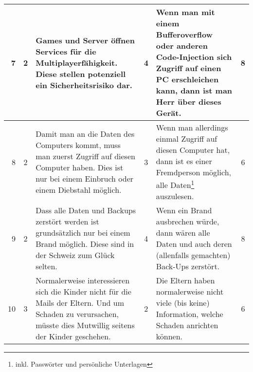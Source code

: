 \begin{landscape}
\begin{tabularx}{\columnwidth}{|r|c|X|c|X|c|}
	7 &  \cellcolor{yellow}2 & Games und Server öffnen Services für die Multiplayerfähigkeit. Diese stellen potenziell ein Sicherheitsrisiko dar. & \cellcolor{red}4 & Wenn man mit einem Bufferoverflow oder anderen Code-Injection sich Zugriff auf einen PC erschleichen kann, dann ist man Herr über dieses Gerät. & \cellcolor{orange}8 \\ \hline
	8 &  \cellcolor{yellow}2 & Damit man an die Daten des Computers kommt, muss man zuerst Zugriff auf diesen Computer haben. Dies ist nur bei einem Einbruch oder einem Diebstahl möglich. & \cellcolor{orange}3 & Wenn man allerdings einmal Zugriff auf diesen Computer hat, dann ist es einer Fremdperson möglich, alle Daten\footnote{inkl. Passwörter und persönliche Unterlagen} auszulesen.  & \cellcolor{yellow}6 \\ \hline
	9 &  \cellcolor{yellow}2 & Dass alle Daten und Backups zerstört werden ist grundsätzlich nur bei einem Brand möglich. Diese sind in der Schweiz zum Glück selten. & \cellcolor{red}4 & Wenn ein Brand ausbrechen würde, dann wären alle Daten und auch deren (allenfalls gemachten) Back-Ups zerstört. & \cellcolor{orange}8 \\ \hline
	10 &  \cellcolor{orange}3 & Normalerweise interessieren sich die Kinder nicht für die Mails der Eltern. Und um Schaden zu verursachen, müsste dies Mutwillig seitens der Kinder geschehen. & \cellcolor{yellow}2 & Die Eltern haben normalerweise nicht viele (bis keine) Information, welche Schaden anrichten können. & \cellcolor{yellow}6 \\ \hline
\end{tabularx}

\newpage

\end{landscape}